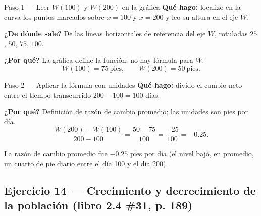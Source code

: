\documentclass[11pt]{article}
\begin{document}
\begin{paso}{Paso 1 --- Leer $W(100)$ y $W(200)$ en la gráfica}
\textbf{Qué hago:} localizo en la curva los puntos marcados sobre $x=100$ y $x=200$ y leo su altura en el eje $W$.

\textbf{¿De dónde sale?} De las líneas horizontales de referencia del eje $W$, rotuladas $25$, $50$, $75$, $100$.

\textbf{¿Por qué?} La gráfica define la función; no hay fórmula para $W$.
\[
W(100)=75\ \text{pies},\qquad W(200)=50\ \text{pies}.
\]
\end{paso}

\begin{paso}{Paso 2 --- Aplicar la fórmula con unidades}
\textbf{Qué hago:} divido el cambio neto entre el tiempo transcurrido $200-100=100$ días.

\textbf{¿Por qué?} Definición de razón de cambio promedio; las unidades son pies por día.
\[
\frac{W(200)-W(100)}{200-100}=\frac{50-75}{100}=\frac{-25}{100}=-0.25.
\]
\end{paso}

\begin{resp}
La razón de cambio promedio fue $-0.25$ pies por día (el nivel bajó, en promedio, un cuarto de pie diario entre el día 100 y el día 200).
\end{resp}

\subsection*{Ejercicio 14 — Crecimiento y decrecimiento de la población (libro 2.4 \#31, p. 189)}
\end{document}
